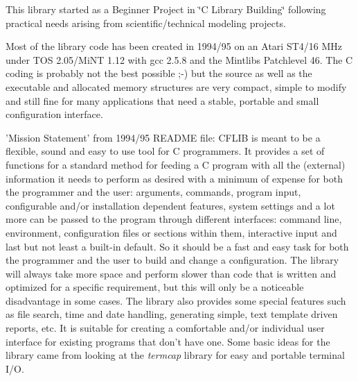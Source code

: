 This library started as a Beginner Project in \char`\"{}C Library Building\char`\"{} following practical needs arising from scientific/technical modeling projects.

Most of the library code has been created in 1994/95 on an Atari ST4/16 MHz under TOS 2.05/MiNT 1.12 with gcc 2.5.8 and the Mintlibs Patchlevel 46. The C coding is probably not the best possible ;-) but the source as well as the executable and allocated memory structures are very compact, simple to modify and still fine for many applications that need a stable, portable and small configuration interface.

\begin{Desc}
\item['Mission Statement' from 1994/95 README file:]CFLIB is meant to be a flexible, sound and easy to use tool for C programmers. It provides a set of functions for a standard method for feeding a C program with all the (external) information it needs to perform as desired with a minimum of expense for both the programmer and the user: arguments, commands, program input, configurable and/or installation dependent features, system settings and a lot more can be passed to the program through different interfaces: command line, environment, configuration files or sections within them, interactive input and last but not least a built-in default. So it should be a fast and easy task for both the programmer and the user to build and change a configuration. The library will always take more space and perform slower than code that is written and optimized for a specific requirement, but this will only be a noticeable disadvantage in some cases. The library also provides some special features such as file search, time and date handling, generating simple, text template driven reports, etc. It is suitable for creating a comfortable and/or individual user interface for existing programs that don't have one. Some basic ideas for the library came from looking at the {\em termcap\/} library for easy and portable terminal I/O. \par
 \end{Desc}
